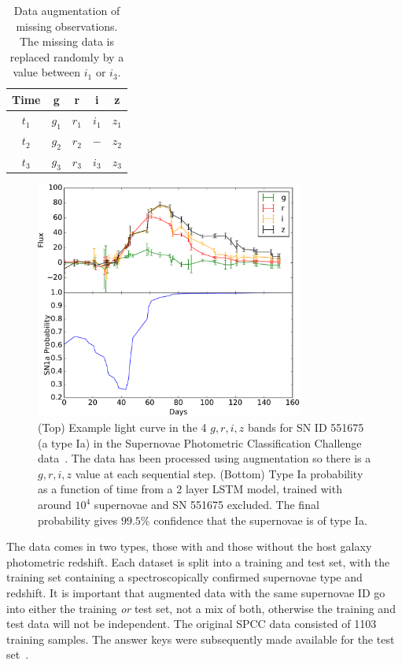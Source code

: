 \documentclass[nofootinbib,amsmath,amssymb,10pt,eqsecnum, twocolumn]{revtex4-1}
\begin{document}
\begin{table}[htdp]
\begin{center}
\begin{tabular}{|c|c|c|c|c|} \hline  
 Time & g & r & i & z \\ \hline \hline 
$ t_1$  & $g_1$ & $r_1$ &$ i_1$ & $z_1$ \\ \hline 
$ t_2$  & $g_2$ & $r_2$ &$  - $ & $z_2$ \\ \hline 
$ t_3$  & $g_3$ & $r_3$ &$ i_3$ & $z_3$ \\ \hline 
 \end{tabular}
\end{center}
\label{tab:augment}
\caption{Data augmentation of missing observations. The missing data is replaced randomly by a value between $i_1$ or $i_3$.}
\end{table}%

\begin{figure}
\centering
\includegraphics[width=88mm, angle=0]{2.pdf}
\caption{\label{fig:lightcurve} (Top) Example light curve in the 4 $g, r, i, z$ bands for SN ID 551675 (a type Ia) in the Supernovae Photometric Classification Challenge data~\cite{Kessler:2010wk}. The data has been processed using augmentation so there is a $g, r, i, z$ value at each sequential step. (Bottom) Type Ia probability as a function of time from a 2 layer LSTM model, trained with around $10^4$ supernovae and SN 551675 excluded. The final probability gives $99.5\%$ confidence that the supernovae is of type Ia. 
 }
\end{figure}


The data comes in two types, those with and those without the  host galaxy photometric redshift. Each dataset is split into a training and test set, with the training set containing a spectroscopically confirmed supernovae type and redshift. It is important that augmented data with the same supernovae ID go into either the training {\em or} test set, not a mix of both, otherwise the training and test data will not be independent. The original SPCC data consisted of 1103 training samples. The answer keys were subsequently made available for the test set~\cite{Kessler:2010qj}. 
\end{document}
